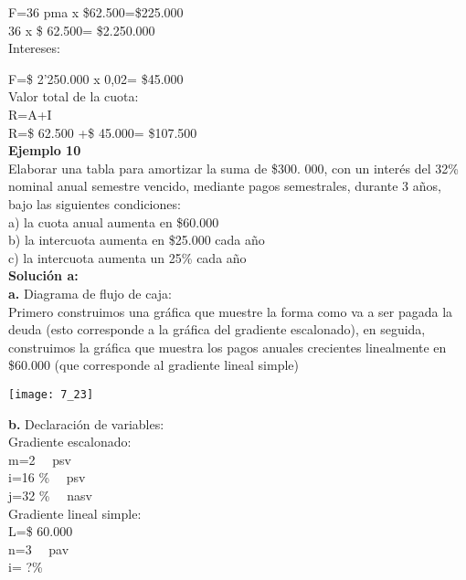     F=36 pma x \$62.500=\$225.000\\
	36 x \$ 62.500= \$2.250.000 \\
	

Intereses:


	F=\$ 2'250.000 x 0,02= \$45.000\\


Valor total de la cuota:\\

    R=A+I\\


	R=\$ 62.500 +\$ 45.000= \$107.500\\


\textbf{Ejemplo 10 }\\
Elaborar una tabla para amortizar la suma de \$300. 000, con un interés del 32\% nominal anual semestre vencido, mediante pagos semestrales, durante 3 años, bajo las siguientes condiciones:\\

a)	la cuota anual aumenta en \$60.000 \\
b)	la intercuota aumenta en \$25.000 cada año \\
c)	la intercuota aumenta un 25\% cada año\\

\textbf{Solución a:}\\
\textbf{a.}	Diagrama de flujo de caja:\\
Primero construimos una gráfica que muestre la forma como va a ser pagada la deuda (esto corresponde a la gráfica del gradiente escalonado), en seguida, construimos la gráfica que muestra los pagos anuales crecientes linealmente en \$60.000 (que corresponde al gradiente lineal simple)
\begin{center}
	\texttt{[image: 7\_23]}
\end{center}
\textbf{b.}	Declaración de variables:\\
Gradiente escalonado:\\


	m=2 \ \ psv\\
	i=16 \% \ \ psv\\
	j=32 \% \ \ nasv\\
	

Gradiente lineal simple:\\


	L=\$ 60.000\\
	n=3 \ \ pav\\
	i= ?\%\\
	

